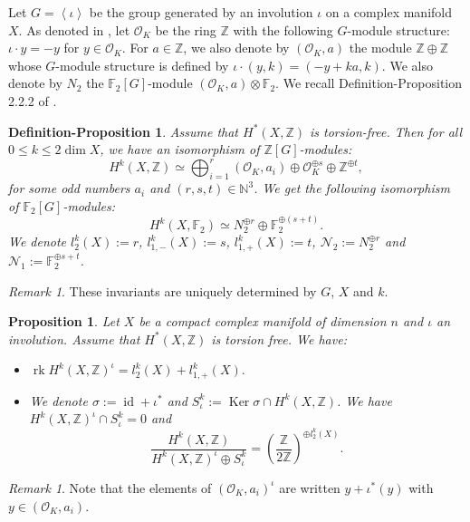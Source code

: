 \documentclass{alggeom}
\DeclareMathOperator{\id}{id}
\DeclareMathOperator{\Ker}{Ker}
\DeclareMathOperator{\rk}{rk}
\newcommand{\Z}{\mathbb{Z}}
\theoremstyle{plain}
\newtheorem{prop}[theorem]{Proposition}
\newtheorem{defipro}[theorem]{Definition-Proposition}
\theoremstyle{definition}
\theoremstyle{remark}
\newtheorem{rmk}[theorem]{Remark}
\begin{document}
Let $G=\left\langle \iota\right\rangle$ be the group generated by an involution $\iota$ on a complex manifold $X$.
As denoted in \cite[Section 5]{BNS}, let $\mathcal{O}_{K}$ be the ring $\Z$ with the following $G$-module structure:
$\iota\cdot y=-y$ for $y\in \mathcal{O}_{K}$. For $a\in \Z$, we also denote by $(\mathcal{O}_{K},a)$ the module $\Z\oplus\Z$ whose $G$-module structure is defined by $\iota\cdot(y,k)=(-y+ka,k)$. We also denote by $N_{2}$ the $\mathbb{F}_{2}[G]$-module $(\mathcal{O}_{K},a)\otimes\mathbb{F}_{2}$.
We recall Definition-Proposition 2.2.2 of \cite{Lol}.
\begin{defipro}\label{defiprop}
Assume that $H^{*}(X,\Z)$ is torsion-free. Then for all $0\leq k \leq 2\dim X$, we have an isomorphism of $\Z[G]$-modules:
$$H^{k}(X,\Z)\simeq \bigoplus_{i=1}^{r}(\mathcal{O}_{K},a_{i})\oplus \mathcal{O}_{K}^{\oplus s}\oplus\Z^{\oplus t},$$
for some odd numbers $a_{i}$ and $(r,s,t)\in\mathbb{N}^3$.
We get the following isomorphism of $\mathbb{F}_{2}[G]$-modules:
$$H^{k}(X,\mathbb{F}_{2})\simeq N_{2}^{\oplus r}\oplus\mathbb{F}_{2}^{\oplus (s+t)}.$$
We denote $l_{2}^k(X):=r$, $l_{1,-}^k(X):=s$, $l_{1,+}^k(X):=t$, $\mathcal{N}_{2}:=N_{2}^{\oplus r}$ and $\mathcal{N}_{1}:=\mathbb{F}_{2}^{\oplus s+t}$.
\end{defipro}
\begin{rmk}
These invariants are uniquely determined by $G$, $X$ and $k$.
\end{rmk}
\begin{prop}\cite[Sect.2~2]{Lol}\label{sarti}
Let $X$ be a compact complex manifold of dimension $n$ and $\iota$ an involution. Assume that $H^{*}(X,\Z)$ is torsion free.
We have:
\begin{itemize}
\item[(i)]
$\rk H^{k}(X,\Z)^{\iota}=l_{2}^k(X)+l_{1,+}^k(X).$
\item[(ii)]
We denote $\sigma:=\id+\iota^*$ and $S^k_\iota:= \Ker \sigma \cap H^{k}(X,\Z)$. 
We have $H^{k}(X,\Z)^{\iota}\cap S^k_\iota=0$ and
$$\frac{H^{k}(X,\Z)}{H^{k}(X,\Z)^{\iota}\oplus S^k_\iota}=\left(\frac{\Z}{2\Z}\right)^{\oplus l_2^k(X)}.$$
\end{itemize}
\end{prop}
\begin{rmk}\label{x+ix}
Note that the elements of $(\mathcal{O}_{K},a_{i})^{\iota}$ are written $y+\iota^{*}(y)$ with $y\in (\mathcal{O}_{K},a_{i})$.
\end{rmk}
\end{document}
